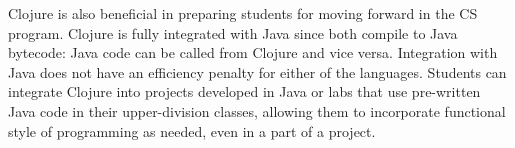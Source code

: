\documentclass[submission,copyright,creativecommons]{eptcs}
\newcommand{\allcomments}[1]{{#1}}
\newcommand{\elenacomment}[1]{{\bf \textcolor{ForestGreen}{\allcomments{{#1}}}}}
\newcommand{\stephencomment}[1]{{\bf \color{StephensBlue}{\allcomments{{#1}}}}} %
\newcommand{\joecomment}[1]{{\bf \color{JoesGold}{\allcomments{{#1}}}}}
\begin{document}
Clojure is also beneficial in preparing students for moving forward in the CS program. 
Clojure is fully integrated with Java since both compile to Java bytecode: Java code can be called from Clojure and vice versa.
Integration with Java does not have an efficiency penalty for either of the languages. 
Students can  integrate Clojure into projects developed in Java or labs that use pre-written Java code in their upper-division classes, allowing them to incorporate functional style of programming as needed, even in a part of a project. 
\end{document}
